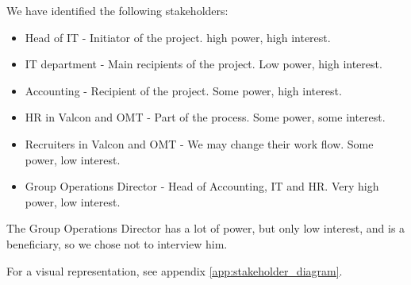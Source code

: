 We have identified the following stakeholders: 
\begin{itemize}
\item Head of IT - Initiator of the project. high power, high interest.
\item IT department - Main recipients of the project. Low power, high interest.
\item Accounting - Recipient of the project. Some power, high interest.
\item HR in Valcon and OMT - Part of the process. Some power, some interest.
\item Recruiters in Valcon and OMT - We may change their work flow. Some power, low interest.
\item Group Operations Director - Head of Accounting, IT and HR. Very high power, low interest.
\end{itemize}
The Group Operations Director has a lot of power, but only low interest, and is a beneficiary, so we chose not to interview him.

For a visual representation, see appendix \ref{app:stakeholder_diagram}.
